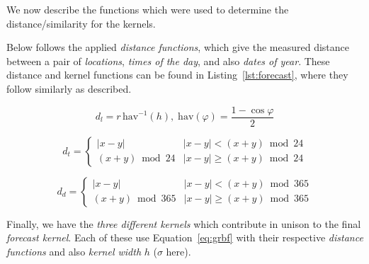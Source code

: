 \documentclass[a4paper, twocolumn]{article}
\begin{document}
    We now describe the functions which were used to determine the distance/similarity for the kernels.

    Below follows the applied \emph{distance functions}, which give the measured distance between a pair of \emph{locations}, \emph{times of the day}, and also \emph{dates of year}. These distance and kernel functions can be found in Listing~\ref{lst:forecast}, where they follow similarly as described.

    \begin{equation*} \label{eq:location}
    d_l = r\, \mathrm{hav}^{-1}(h),\; \mathrm{hav}(\varphi) = \frac{1 - \cos\varphi}{2}
    \end{equation*}
    
    
    
    \begin{equation*} \label{eq:time}
    d_t = \begin{cases}
    |x - y| & |x - y| < (x + y) \bmod 24\\
    (x + y) \bmod 24 & |x - y| \geq (x + y) \bmod 24
    \end{cases}
    \end{equation*}

   

    \begin{equation*} \label{eq:day}
    d_d = \begin{cases}
    |x - y| & |x - y| < (x + y) \bmod 365\\
    (x + y) \bmod 365 & |x - y| \geq (x + y) \bmod 365
    \end{cases}
    \end{equation*}

   
    

    Finally, we have the \emph{three different kernels} which contribute in unison to the final \emph{forecast kernel}. Each of these use Equation~\ref{eq:grbf} with their respective \emph{distance functions} and also \emph{kernel width} \(h\) (\(\sigma\) here).
\end{document}
